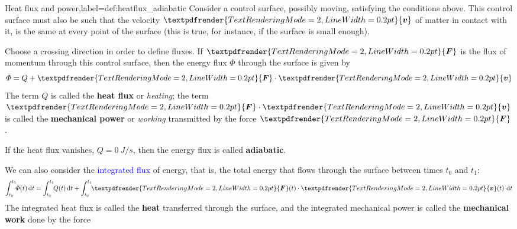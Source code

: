 \documentclass[a4paper,12pt,%
onecolumn,oneside,%
british%
]{memoir}
\renewcommand*{\bm}[1]{\textpdfrender{TextRenderingMode=2,LineWidth=0.2pt}{\boldsymbol{#1}}}
\newcommand*{\di}{\mathrm{d}}%
\renewcommand*{\|}[1][]{\nonscript\:#1\vert\nonscript\:\mathopen{}}
\newcommand*{\sect}{\S}%
\renewcommand*{\autoref}[2]{\sidepar{\vspace{-1ex}\footnotesize{\color{blue}\faIcon{%
angle-right%
}\enspace\sect~\ref{#1} page~\pageref{#1}}}\textcolor{blue}{#2}}
\newcommand*{\yv}{\bm{v}}
\newcommand*{\yti}{t_{0}}
\newcommand*{\ytf}{t_{1}}
\newcommand*{\yH}{\varPhi}%
\newcommand*{\yQ}{Q}%
\newcommand*{\yF}{\bm{F}}
\begin{document}
\begin{definition}{Heat flux and power,label={def:heatflux_adiabatic}}
  Consider a control surface, possibly moving, satisfying the conditions above. This control surface must also be such that the velocity $\yv$ of matter in contact with it, is the same at every point of the surface (this is true, for instance, if the surface is small enough).

  \smallskip

  Choose a crossing direction in order to define fluxes. If $\yF$ is the flux of momentum through this control surface, then the energy flux $\yH$ through the surface is given by
\begin{equation}
  \label{eq:heat_power}
  \yH = \yQ + \yF\cdot \yv
\end{equation}
The term $\yQ$ is called the \textbf{heat flux} or \emph{heating}; the  term $\yF\cdot \yv$ is called the \textbf{mechanical power} or \emph{working} transmitted by the force $\yF$.

\smallskip

If the heat flux vanishes, $\yQ=\qty{0}{J/s}$, then the energy flux is called \textbf{adiabatic}.

\smallskip

We can also consider the \autoref{sec:total_flow}{integrated flux} of energy, that is, the total energy that flows through the surface between times $\yti$ and $\ytf$:
\begin{equation*}
  \int_{\yti}^{\ytf}\!\!\yH(t)\,\di t =
  \int_{\yti}^{\ytf}\!\!\yQ(t)\,\di t
  + \int_{\yti}^{\ytf}\!\!\yF(t)\cdot \yv(t)\ \di t
\end{equation*}
The integrated heat flux is called the \textbf{heat} transferred through the surface, and the integrated mechanical power is called the \textbf{mechanical work} done by the force
\end{definition}
\end{document}
